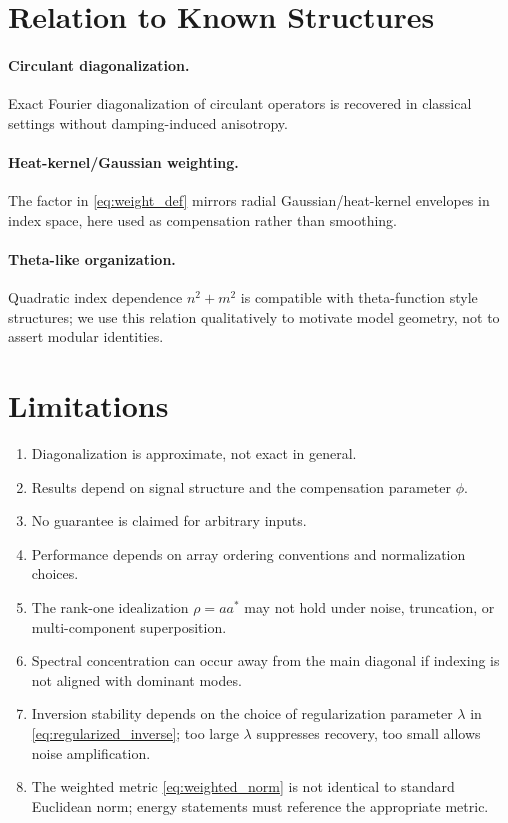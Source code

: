 \documentclass[11pt]{article}
\begin{document}
\section{Relation to Known Structures}
\paragraph{Circulant diagonalization.}
Exact Fourier diagonalization of circulant operators is recovered in classical settings without damping-induced anisotropy.

\paragraph{Heat-kernel/Gaussian weighting.}
The factor in \eqref{eq:weight_def} mirrors radial Gaussian/heat-kernel envelopes in index space, here used as compensation rather than smoothing.

\paragraph{Theta-like organization.}
Quadratic index dependence $n^2+m^2$ is compatible with theta-function style structures; we use this relation qualitatively to motivate model geometry, not to assert modular identities.

\section{Limitations}
\begin{enumerate}
    \item Diagonalization is approximate, not exact in general.
    \item Results depend on signal structure and the compensation parameter $\phi$.
    \item No guarantee is claimed for arbitrary inputs.
    \item Performance depends on array ordering conventions and normalization choices.
    \item The rank-one idealization $\rho=a a^{\ast}$ may not hold under noise, truncation, or multi-component superposition.
    \item Spectral concentration can occur away from the main diagonal if indexing is not aligned with dominant modes.
    \item Inversion stability depends on the choice of regularization parameter $\lambda$ in \eqref{eq:regularized_inverse}; too large $\lambda$ suppresses recovery, too small allows noise amplification.
    \item The weighted metric \eqref{eq:weighted_norm} is not identical to standard Euclidean norm; energy statements must reference the appropriate metric.
\end{enumerate}
\end{document}

